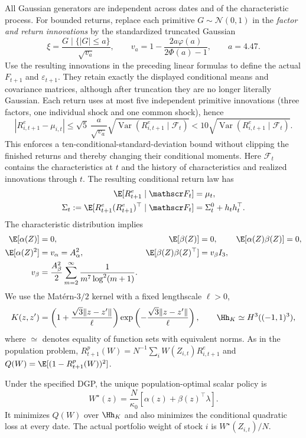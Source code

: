 All Gaussian generators are independent across dates and of the characteristic process.
For bounded returns, replace each primitive $G\sim\mathcal N(0,1)$ in the
\emph{factor and return innovations} by the standardized truncated Gaussian
\[
\xi=\frac{G\mid\{|G|\leq a\}}{\sqrt{v_a}},\qquad
v_a=1-\frac{2a\varphi(a)}{2\Phi(a)-1},\qquad a=4.47.
\]
Use the resulting innovations in the preceding linear formulas to define the actual
$F_{t+1}$ and $\varepsilon_{t+1}$. They retain exactly the displayed conditional
means and covariance matrices, although after truncation they are no longer
literally Gaussian. Each return uses at most five independent primitive innovations
(three factors, one individual shock and one common shock), hence
\[
|R^e_{i,t+1}-\mu_{i,t}|
\leq\sqrt5\,\frac{a}{\sqrt{v_a}}
\sqrt{\operatorname{Var}(R^e_{i,t+1}\mid\mathscr F_t)}
<10\sqrt{\operatorname{Var}(R^e_{i,t+1}\mid\mathscr F_t)}.
\]
This enforces a ten-conditional-standard-deviation bound without clipping the
finished returns and thereby changing their conditional moments. Here
$\mathscr F_t$ contains the characteristics at $t$ and the history of
characteristics and realized innovations through $t$.
The resulting conditional return law has
\begin{align*}
\E[R^e_{t+1}\mid\mathscr F_t]&=\mu_t,\\
\Sigma_t:=\E[R^e_{t+1}(R^e_{t+1})^\top\mid\mathscr F_t]
&=\Sigma_t^0+h_th_t^\top.
\end{align*}
The characteristic distribution implies
\begin{align*}
\E[\alpha(Z)]&=0,&\E[\beta(Z)]&=0,&\E[\alpha(Z)\beta(Z)]&=0,\\
\E[\alpha(Z)^2]&=v_\alpha=A_\alpha^2,
&\E[\beta(Z)\beta(Z)^\top]&=v_\beta I_3,\\
v_\beta&=\frac{A_\beta^2}{2}\sum_{m=2}^\infty
\frac1{m^7\log^2(m+1)}.
\end{align*}
We use the Mat\'ern-$3/2$ kernel with a fixed lengthscale $\ell>0$,
\[
K(z,z')=\left(1+\frac{\sqrt3\|z-z'\|}{\ell}\right)
\exp\left(-\frac{\sqrt3\|z-z'\|}{\ell}\right),
\qquad\Hh_K\simeq H^3((-1,1)^3),
\]
where $\simeq$ denotes equality of function sets with equivalent norms.
As in the population problem, $R^p_{t+1}(W)=N^{-1}\sum_iW(Z_{i,t})R^e_{i,t+1}$ and
$Q(W)=\E[(1-R^p_{t+1}(W))^2]$.
\begin{proposition}
\label{prop:mc_optimal}
Under the specified DGP, the unique population-optimal scalar policy is
\[
W^\star(z)=\frac{N}{\kappa_0}
\left[\alpha(z)+\beta(z)^\top\lambda\right].
\]
It minimizes $Q(W)$ over $\Hh_K$ and also minimizes the conditional quadratic
loss at every date. The actual portfolio weight of stock $i$ is
$W^\star(Z_{i,t})/N$.
\end{proposition}
